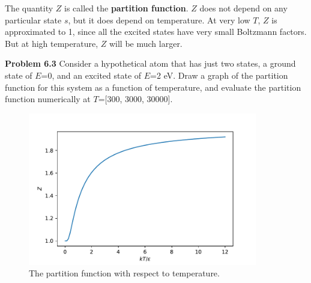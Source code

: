 The quantity $Z$ is called the {\bf partition function}. $Z$ does not depend on any particular state $s$, but it does depend on temperature. At very 
low $T$, $Z$ is approximated to 1, since all the excited states have very small Boltzmann factors. But at high temperature, $Z$ will be much larger.

{\bf Problem 6.3} Consider a hypothetical atom that has just two states, a ground state of $E$=0, and an excited state of $E$=2 eV. Draw a graph of
 the partition function for this system as a function of temperature, and evaluate the partition function numerically at $T$=[300, 3000, 30000].

\begin{figure}[h]
\centering
\includegraphics[width=10cm]{imgs/Partition-2s}
\caption{The partition function with respect to temperature. }
\end{figure}

